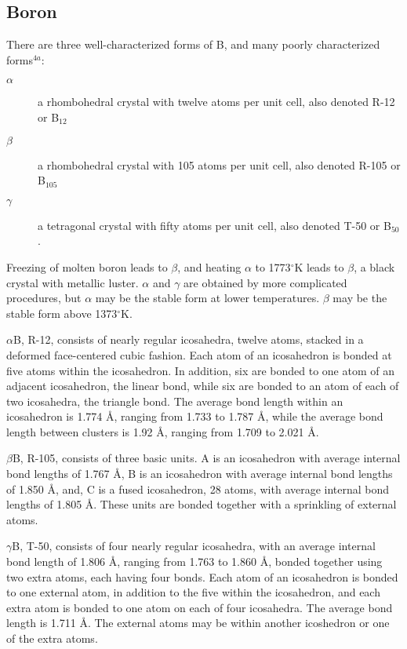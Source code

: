 \subsection{Boron}

There are three well-characterized forms of B, and many poorly 
characterized forms$^{4a}$:

\begin{description}
\item[$\alpha$] a rhombohedral crystal with twelve atoms per unit 
cell, also denoted R-12 or B$_{12}$
\item[$\beta$] a rhombohedral crystal with 105 atoms per unit cell, 
also denoted R-105 or B$_{105}$ 
\item[$\gamma$] a tetragonal crystal 
with fifty atoms per unit cell, also denoted T-50 or B$_{50}$.
\end{description}

Freezing of molten boron leads to $\beta$, and heating $\alpha$ 
to 1773$^{\circ}$K leads to $\beta$, a black crystal with metallic 
luster.  $\alpha$ and $\gamma$ are obtained by more complicated 
procedures, but $\alpha$ may be the stable form at lower 
temperatures.  $\beta$ may be the stable form above 1373$^{\circ}$K.

$\alpha$B, R-12, consists of nearly regular icosahedra, twelve atoms, 
stacked in a deformed face-centered cubic fashion.  Each atom of an 
icosahedron is bonded at five atoms within the icosahedron.  In addition, 
six are bonded to one atom of an adjacent icosahedron, the linear 
bond, while six are bonded to an atom of each of two icosahedra, the 
triangle bond.  The average bond length within an icosahedron is 1.774 
\AA, ranging from 1.733 to 1.787 \AA, while
the average bond length between clusters is 1.92 \AA, ranging from 1.709 to
2.021 \AA.
	
$\beta$B, R-105, consists of three basic units.  A
is an icosahedron with average internal bond lengths of 1.767 \AA, B 
is an icosahedron with average internal bond lengths of 1.850 \AA, 
and, C is a fused icosahedron, 28 atoms, with average internal bond
lengths of 1.805 \AA.  These units are bonded together with a sprinkling
of external atoms.
	
$\gamma$B, T-50, consists of four nearly regular icosahedra, with an average
internal bond length of 1.806 \AA, ranging from 1.763 to 1.860 \AA, 
bonded together using two extra atoms, each having four bonds.  Each atom 
of an icosahedron is bonded to one external atom, in addition to the five 
within the
icosahedron, and each extra atom is bonded to one atom on each of four
icosahedra. The average bond length is 1.711 \AA.  The external atoms may be 
within another icoshedron or one of the extra atoms.  

